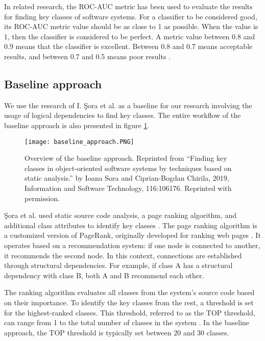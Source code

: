 In related research, the ROC-AUC metric has been used to evaluate the results for finding key classes of software systems. For a classifier to be considered good, its ROC-AUC metric value should be as close to 1 as possible.
When the value is 1, then the classifier is considered to be perfect. A metric value between 0.8 and 0.9 means that the classifier is excellent. Between 0.8 and 0.7 means acceptable results, and between 0.7 and 0.5 means poor results \cite{ROC_METRIC_VALS, b4}. 



\subsection{Baseline approach}
\label{subsec:key_previous_measurements}

\hspace{4em}We use the research of I. Şora et al. \cite{Finding-key-classes} as a baseline for our research involving the usage of logical dependencies to find key classes. The entire workflow of the baseline approach is also presented in figure \ref{fig:baseline_approach}.

\begin{figure}[H]
\centering
\texttt{[image: baseline\_approach.PNG]}
\caption{Overview of the baseline approach. Reprinted from “Finding key classes in object-oriented
software systems by techniques based on static analysis.” by Ioana Sora and Ciprian-Bogdan Chirila, 2019, Information and Software Technology, 116:106176. Reprinted with permission. }
\label{fig:baseline_approach}
\centering
\end{figure}


Şora et al. used static source code analysis, a page ranking algorithm, and additional class attributes to identify key classes \cite{PagerankENASE, enase15, PagerankSACI, Finding-key-classes}. The page ranking algorithm is a customized version of PageRank, originally developed for ranking web pages \cite{ilprints422}. It operates based on a recommendation system: if one node is connected to another, it recommends the second node. In this context, connections are established through structural dependencies. For example, if class A has a structural dependency with class B, both A and B recommend each other.

The ranking algorithm evaluates all classes from the system’s source code based on their importance. To identify the key classes from the rest, a threshold is set for the highest-ranked classes. This threshold, referred to as the TOP threshold, can range from 1 to the total number of classes in the system \cite{b4}. In the baseline approach, the TOP threshold is typically set between 20 and 30 classes.


